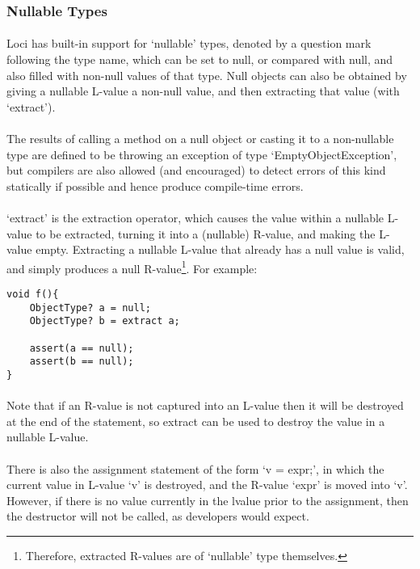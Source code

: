 \documentclass[12pt,twoside,notitlepage]{report}
\begin{document}
\subsubsection{Nullable Types}

\paragraph{}
Loci has built-in support for `nullable' types, denoted by a question mark following the type name, which can be set to null, or compared with null, and also filled with non-null values of that type. Null objects can also be obtained by giving a nullable L-value a non-null value, and then extracting that value (with `extract').

\paragraph{}
The results of calling a method on a null object or casting it to a non-nullable type are defined to be throwing an exception of type `EmptyObjectException', but compilers are also allowed (and encouraged) to detect errors of this kind statically if possible and hence produce compile-time errors.

\paragraph{}
`extract' is the extraction operator, which causes the value within a nullable L-value to be extracted, turning it into a (nullable) R-value, and making the L-value empty. Extracting a nullable L-value that already has a null value is valid, and simply produces a null R-value\footnote{Therefore, extracted R-values are of `nullable' type themselves.}. For example:

\begin{lstlisting}
void f(){
	ObjectType? a = null;
	ObjectType? b = extract a;
	
	assert(a == null);
	assert(b == null);
}
\end{lstlisting}

\paragraph{}
Note that if an R-value is not captured into an L-value then it will be destroyed at the end of the statement, so extract can be used to destroy the value in a nullable L-value.

\paragraph{}
There is also the assignment statement of the form `v = expr;', in which the current value in L-value `v' is destroyed, and the R-value `expr' is moved into `v'. However, if there is no value currently in the lvalue prior to the assignment, then the destructor will not be called, as developers would expect.
\end{document}
